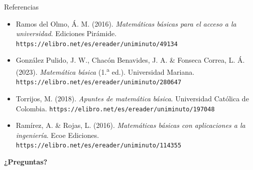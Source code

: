 \documentclass[aspectratio=169,10pt]{beamer}
\begin{document}
\begin{frame}{Referencias}
  \footnotesize
  \begin{itemize}
    \item[{[1]}] Ramos del Olmo, Á. M. (2016). \textit{Matemáticas básicas
      para el acceso a la universidad}. Ediciones Pirámide.
      \texttt{https://elibro.net/es/ereader/uniminuto/49134}
    \item[{[2]}] González Pulido, J. W., Chacón Benavides, J. A. \&
      Fonseca Correa, L. Á. (2023). \textit{Matemática básica}
      (1.\textsuperscript{a} ed.). Universidad Mariana.
      \texttt{https://elibro.net/es/ereader/uniminuto/280647}
    \item[{[3]}] Torrijos, M. (2018). \textit{Apuntes de matemática básica}.
      Universidad Católica de Colombia.
      \texttt{https://elibro.net/es/ereader/uniminuto/197048}
    \item[{[4]}] Ramírez, A. \& Rojas, L. (2016). \textit{Matemáticas básicas
      con aplicaciones a la ingeniería}. Ecoe Ediciones.
      \texttt{https://elibro.net/es/ereader/uniminuto/114355}
  \end{itemize}

  \vspace{0.3cm}
  \begin{center}
    {\Large\color{uniAzul}\textbf{¿Preguntas?}}
  \end{center}
\end{frame}
\end{document}
